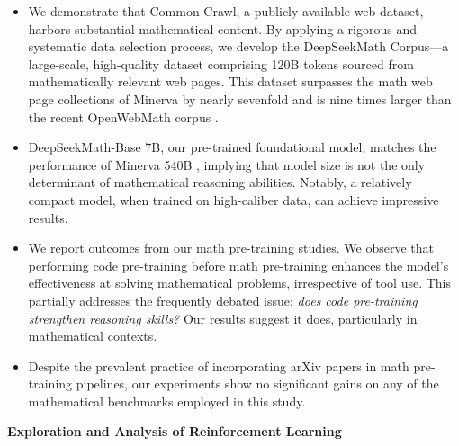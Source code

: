 \begin{itemize}[topsep=0pt]
    \item We demonstrate that Common Crawl, a publicly available web dataset, harbors substantial mathematical content. By applying a rigorous and systematic data selection process, we develop the DeepSeekMath Corpus—a large-scale, high-quality dataset comprising 120B tokens sourced from mathematically relevant web pages. This dataset surpasses the math web page collections of Minerva \citep{minerva} by nearly sevenfold and is nine times larger than the recent OpenWebMath corpus \citep{openwebmath}.

    \item DeepSeekMath-Base 7B, our pre-trained foundational model, matches the performance of Minerva 540B \citep{minerva}, implying that model size is not the only determinant of mathematical reasoning abilities. Notably, a relatively compact model, when trained on high-caliber data, can achieve impressive results.

    \item We report outcomes from our math pre-training studies. We observe that performing code pre-training before math pre-training enhances the model’s effectiveness at solving mathematical problems, irrespective of tool use. This partially addresses the frequently debated issue: \textit{does code pre-training strengthen reasoning skills?} Our results suggest it does, particularly in mathematical contexts.

    \item Despite the prevalent practice of incorporating arXiv papers in math pre-training pipelines, our experiments show no significant gains on any of the mathematical benchmarks employed in this study.
\end{itemize}

\textbf{Exploration and Analysis of Reinforcement Learning}

